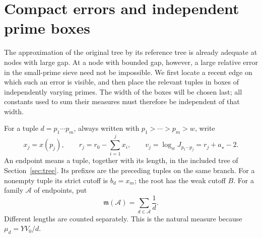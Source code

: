 \section{Compact errors and independent prime boxes}\label{sec:boxes}

The approximation of the original tree by its reference tree is already
adequate at nodes with large gap.  At a node with bounded gap, however, a
large relative error in the small-prime sieve need not be impossible.
We first locate a recent edge on which such an error is visible, and then
place the relevant tuples in boxes of independently varying primes.
The width of the boxes will be chosen last; all constants used to sum
their measures must therefore be independent of that width.

For a tuple $d=p_1\cdots p_m$, always written with
$p_1>\cdots>p_m>w$, write
\[
 x_j=x(p_j),\qquad
 r_j=r_0-\sum_{i=1}^j x_i,\qquad
 v_j=\log_w J_{p_1\cdots p_j}=r_j+a_\star-2.
\]
An endpoint means a tuple, together with its length, in the included
tree of Section~\ref{sec:tree}.  Its prefixes are the preceding tuples
on the same branch.  For a nonempty tuple its strict cutoff is
$b_d=x_m$; the root has the weak cutoff $B$.
For a family $\mathcal A$ of endpoints, put
\begin{equation}\label{eq:boxes-harmonic-measure}
 \mathfrak m(\mathcal A)=\sum_{d\in\mathcal A}\frac1d.
\end{equation}
Different lengths are counted separately.  This is the natural measure
because $\mu_d=YV_0/d$.

